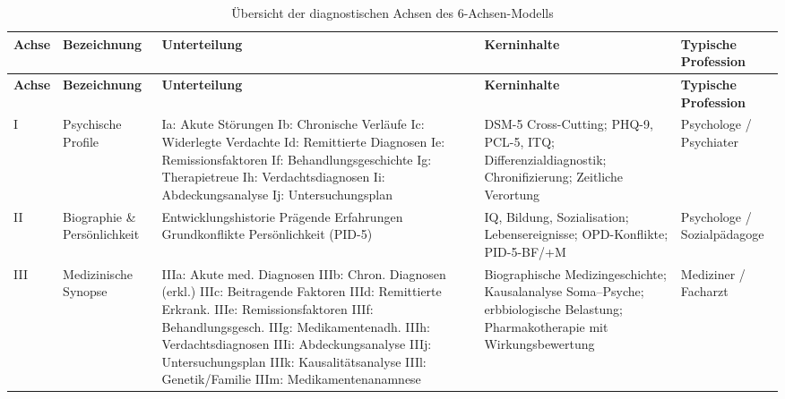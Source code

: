 \documentclass[11pt,a4paper]{article}
\begin{document}
\begin{longtable}{p{0.8cm}p{2.2cm}p{3.8cm}p{4cm}p{2cm}}
\caption{\"Ubersicht der diagnostischen Achsen des 6-Achsen-Modells} \label{tab:achsen} \\
\toprule
\textbf{Achse} & \textbf{Bezeichnung} & \textbf{Unterteilung} & \textbf{Kerninhalte} & \textbf{Typische Profession} \\
\midrule
\endfirsthead
\toprule
\textbf{Achse} & \textbf{Bezeichnung} & \textbf{Unterteilung} & \textbf{Kerninhalte} & \textbf{Typische Profession} \\
\midrule
\endhead
I & Psychische Profile & Ia: Akute St\"orungen \newline Ib: Chronische Verl\"aufe \newline Ic: Widerlegte Verdachte \newline Id: Remittierte Diagnosen \newline Ie: Remissionsfaktoren \newline If: Behandlungsgeschichte \newline Ig: Therapietreue \newline Ih: Verdachtsdiagnosen \newline Ii: Abdeckungsanalyse \newline Ij: Untersuchungsplan & DSM-5 Cross-Cutting; PHQ-9, PCL-5, ITQ; Differenzialdiagnostik; Chronifizierung; Zeitliche Verortung & Psychologe / Psychiater \\
\addlinespace
II & Biographie \& Pers\"onlichkeit & Entwicklungshistorie \newline Pr\"agende Erfahrungen \newline Grundkonflikte \newline Pers\"onlichkeit (PID-5) & IQ, Bildung, Sozialisation; Lebensereignisse; OPD-Konflikte; PID-5-BF/+M & Psychologe / Sozialp\"adagoge \\
\addlinespace
III & Medizinische Synopse & IIIa: Akute med. Diagnosen \newline IIIb: Chron. Diagnosen (erkl.) \newline IIIc: Beitragende Faktoren \newline IIId: Remittierte Erkrank. \newline IIIe: Remissionsfaktoren \newline IIIf: Behandlungsgesch. \newline IIIg: Medikamentenadh. \newline IIIh: Verdachtsdiagnosen \newline IIIi: Abdeckungsanalyse \newline IIIj: Untersuchungsplan \newline IIIk: Kausalit\"atsanalyse \newline IIIl: Genetik/Familie \newline IIIm: Medikamenten\-anamnese & Biographische Medizin\-geschichte; Kausal\-analyse Soma--Psyche; erbbiologische Belastung; Pharmako\-therapie mit Wirkungs\-bewertung & Mediziner / Facharzt \\

\end{longtable}
\end{document}
